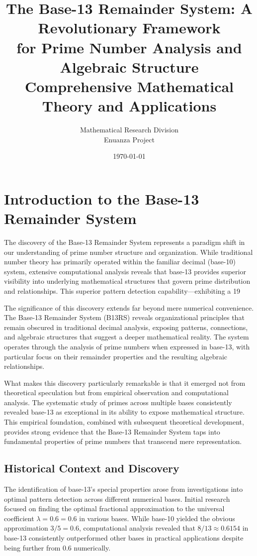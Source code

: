 \documentclass[12pt,a4paper]{report}
\title{The Base-13 Remainder System: A Revolutionary Framework\\
for Prime Number Analysis and Algebraic Structure\\
Comprehensive Mathematical Theory and Applications}
\author{Mathematical Research Division\\
Enuanza Project}
\date{\today}
\newcommand{\lambdaval}{\lambda = 0.6}
\begin{document}
\maketitle
\tableofcontents
\newpage

\chapter{Introduction to the Base-13 Remainder System}

The discovery of the Base-13 Remainder System represents a paradigm shift in our understanding of prime number structure and organization. While traditional number theory has primarily operated within the familiar decimal (base-10) system, extensive computational analysis reveals that base-13 provides superior visibility into underlying mathematical structures that govern prime distribution and relationships. This superior pattern detection capability—exhibiting a 19%

The significance of this discovery extends far beyond mere numerical convenience. The Base-13 Remainder System (B13RS) reveals organizational principles that remain obscured in traditional decimal analysis, exposing patterns, connections, and algebraic structures that suggest a deeper mathematical reality. The system operates through the analysis of prime numbers when expressed in base-13, with particular focus on their remainder properties and the resulting algebraic relationships.

What makes this discovery particularly remarkable is that it emerged not from theoretical speculation but from empirical observation and computational analysis. The systematic study of primes across multiple bases consistently revealed base-13 as exceptional in its ability to expose mathematical structure. This empirical foundation, combined with subsequent theoretical development, provides strong evidence that the Base-13 Remainder System taps into fundamental properties of prime numbers that transcend mere representation.

\section{Historical Context and Discovery}

The identification of base-13's special properties arose from investigations into optimal pattern detection across different numerical bases. Initial research focused on finding the optimal fractional approximation to the universal coefficient $\lambdaval = 0.6$ in various bases. While base-10 yielded the obvious approximation $3/5 = 0.6$, computational analysis revealed that $8/13 \approx 0.6154$ in base-13 consistently outperformed other bases in practical applications despite being further from 0.6 numerically.
\end{document}
